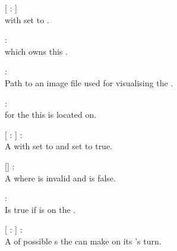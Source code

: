\begin{dlist}
  \item {}[  :  ]\\
   with  set to .
  
  \item {} : \\
   which owns this .
  
  \item {} : \\
  Path to an image file used for visualising the .
  
  \item {} : \\
   for the  this  is located on.
  
  \item {}[  :  ] : \\
  A  with  set to  and  set to true.
  
  \item {}[] : \\
  A  where  is invalid and  is false.
  
  \item {} : \\
  Is true if  is on the .
  
  \item {}[  :  ] : \\
  A  of possible s the  can make on its 's turn.
\end{dlist}

